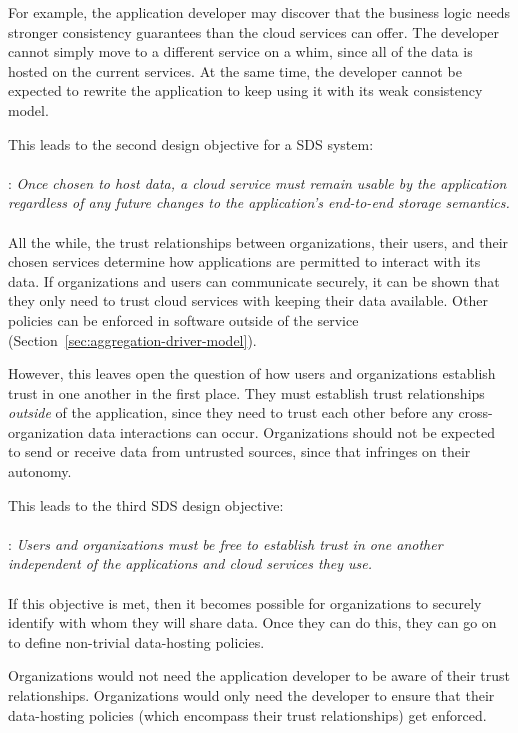 For example, the application developer may discover that the business logic needs stronger
consistency guarantees than the cloud services can offer.  The developer cannot
simply move to a different service on a whim, since all of the data is hosted 
on the current services.  At the same time, the developer cannot be expected
to rewrite the application to keep using it with its weak consistency model.

This leads to the second design objective for a SDS system:
\\
\\
: \emph{Once chosen to host data, a cloud service
must remain usable by the application regardless of any future changes to the
application's end-to-end storage semantics.}
\\
\\
All the while, the trust relationships between organizations, their users, and
their chosen services determine how applications are permitted to
interact with its data.  If organizations and users can communicate securely,
it can be shown that they only need to trust cloud services with
keeping their data available.  Other policies can be enforced
in software outside of the service (Section~\ref{sec:aggregation-driver-model}).

However, this leaves open the question of how users and
organizations establish trust in one another in the first place.  They must
establish trust relationships \emph{outside} of the application, since they need
to trust each other before any cross-organization data interactions can occur.  Organizations should
not be expected to send or receive data from untrusted sources, since that
infringes on their autonomy.

This leads to the third SDS design objective:
\\
\\
: \emph{Users and organizations must be free to
establish trust in one another independent of the
applications and cloud services they use.}
\\
\\
If this objective is met, then it becomes possible for organizations to
securely identify with whom they will share data.  Once they can do this,
they can go on to define non-trivial data-hosting policies.

Organizations would not need the application developer to be aware
of their trust relationships.  Organizations would only need the developer to
ensure that their data-hosting policies (which encompass their trust
relationships) get enforced.

